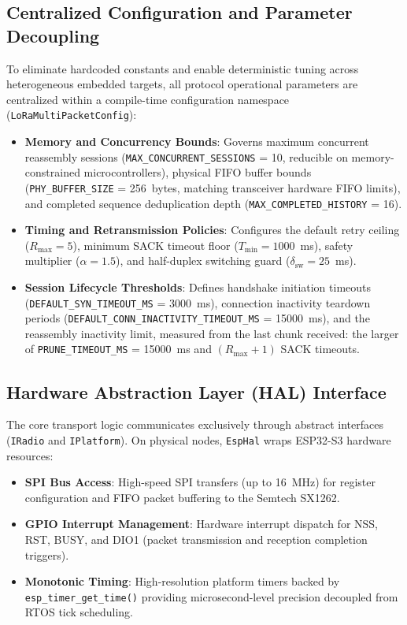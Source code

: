 \documentclass[journal]{IEEEtran}
\begin{document}
\subsection{Centralized Configuration and Parameter Decoupling}
To eliminate hardcoded constants and enable deterministic tuning across heterogeneous embedded targets, all protocol operational parameters are centralized within a compile-time configuration namespace (\texttt{LoRaMultiPacketConfig}):
\begin{itemize}
  \item \textbf{Memory and Concurrency Bounds}: Governs maximum concurrent reassembly sessions (\texttt{MAX\_CONCURRENT\_SESSIONS} = 10, reducible on memory-constrained microcontrollers), physical FIFO buffer bounds (\texttt{PHY\_BUFFER\_SIZE} = 256~bytes, matching transceiver hardware FIFO limits), and completed sequence deduplication depth (\texttt{MAX\_COMPLETED\_HISTORY} = 16).
  \item \textbf{Timing and Retransmission Policies}: Configures the default retry ceiling ($R_{\mathrm{max}} = 5$), minimum SACK timeout floor ($T_{\min} = 1000$~ms), safety multiplier ($\alpha = 1.5$), and half-duplex switching guard ($\delta_{\mathrm{sw}} = 25$~ms).
  \item \textbf{Session Lifecycle Thresholds}: Defines handshake initiation timeouts (\texttt{DEFAULT\_SYN\_TIMEOUT\_MS} = 3000~ms), connection inactivity teardown periods (\texttt{DEFAULT\_CONN\_INACTIVITY\_TIMEOUT\_MS} = 15000~ms), and the reassembly inactivity limit, measured from the last chunk received: the larger of \texttt{PRUNE\_TIMEOUT\_MS} = 15000~ms and $(R_{\mathrm{max}}+1)$ SACK timeouts.
\end{itemize}

\subsection{Hardware Abstraction Layer (\acs{HAL}) Interface}
The core transport logic communicates exclusively through abstract interfaces (\texttt{IRadio} and \texttt{IPlatform}). On physical nodes, \texttt{EspHal} wraps ESP32-S3 hardware resources:
\begin{itemize}
  \item \textbf{SPI Bus Access}: High-speed SPI transfers (up to 16~MHz) for register configuration and FIFO packet buffering to the Semtech SX1262.
  \item \textbf{GPIO Interrupt Management}: Hardware interrupt dispatch for NSS, RST, BUSY, and DIO1 (packet transmission and reception completion triggers).
  \item \textbf{Monotonic Timing}: High-resolution platform timers backed by \texttt{esp\_timer\_get\_time()} providing microsecond-level precision decoupled from RTOS tick scheduling.
\end{itemize}
\end{document}

